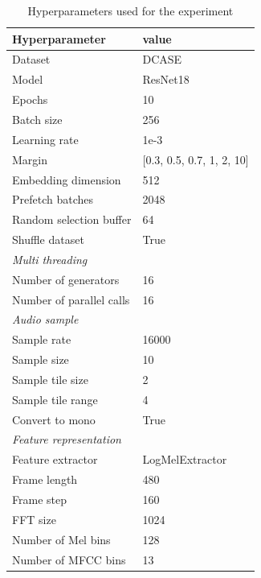 \documentclass[twocolumn]{article}
\begin{document}
\begin{table}[H]
    \centering
    \caption{Hyperparameters used for the experiment}
	\label{tab:Hyperparameters}
    \begin{tabular}{l|l}
        \toprule
        \textbf{Hyperparameter} & \textbf{value} \\ 
        \midrule[1pt]
        Dataset & DCASE \\
        \hline
        Model & ResNet18 \\ 
        \hline
        Epochs & 10 \\ 
        \hline
        Batch size & 256 \\ 
        \hline
        Learning rate & 1e-3 \\
        \hline
        Margin & [0.3, 0.5, 0.7, 1, 2, 10] \\
        \hline
        Embedding dimension & 512 \\
        \hline
        Prefetch batches & 2048 \\ 
        \hline
        Random selection buffer & 64 \\ 
        \hline
        Shuffle dataset & True \\
        \midrule[1pt]
        \multicolumn{2}{l}{\textit{Multi threading}} \\
        \midrule[1pt]
        Number of generators & 16 \\ 
        \hline
        Number of parallel calls & 16 \\
        \midrule[1pt]
        \multicolumn{2}{l}{\textit{Audio sample}} \\
        \midrule[1pt]
        Sample rate & 16000 \\ 
        \hline
        Sample size & 10 \\
        \hline
        Sample tile size & 2 \\
        \hline
        Sample tile range & 4 \\
        \hline
        Convert to mono & True \\
        \midrule[1pt]
        \multicolumn{2}{l}{\textit{Feature representation}} \\
        \midrule[1pt]
        Feature extractor & LogMelExtractor \\ 
        \hline
        Frame length & 480 \\
        \hline
        Frame step & 160 \\
        \hline
        FFT size & 1024 \\
        \hline
        Number of Mel bins & 128 \\
        \hline
        Number of MFCC bins & 13 \\
        \bottomrule
    \end{tabular}
\end{table}
\end{document}
